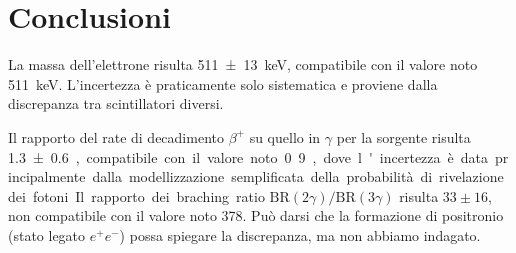 \section{Conclusioni}

La massa dell'elettrone risulta \SI{511(13)}{keV},
compatibile con il valore noto \SI{511}{keV}.
L'incertezza è praticamente solo sistematica e proviene dalla discrepanza tra scintillatori diversi.

Il rapporto del rate di decadimento $\beta^+$ su quello in $\gamma$ per la sorgente \na{}
risulta \SI{1.3 \pm 0.6}, compatibile con il valore noto 0.9,
dove l'incertezza è data principalmente dalla modellizzazione semplificata della probabilità di rivelazione dei fotoni.

Il rapporto dei braching ratio $\text{BR}(2\gamma) / \text{BR}(3\gamma)$
risulta $33 \pm 16$, non compatibile con il valore noto 378.
Può darsi che la formazione di positronio (stato legato $e^+e^-$)
possa spiegare la discrepanza, ma non abbiamo indagato.
